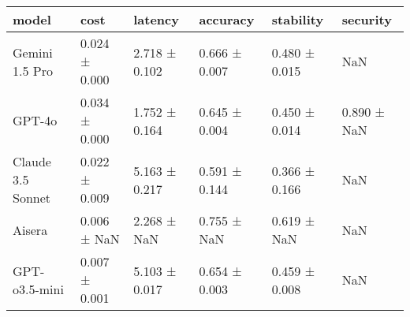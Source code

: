 \begin{tabular}{llllll}
\toprule
model & cost & latency & accuracy & stability & security \\
\midrule
Gemini 1.5 Pro & 0.024 ± 0.000 & 2.718 ± 0.102 & 0.666 ± 0.007 & 0.480 ± 0.015 & NaN \\
GPT-4o & 0.034 ± 0.000 & 1.752 ± 0.164 & 0.645 ± 0.004 & 0.450 ± 0.014 & 0.890 ± NaN \\
Claude 3.5 Sonnet & 0.022 ± 0.009 & 5.163 ± 0.217 & 0.591 ± 0.144 & 0.366 ± 0.166 & NaN \\
Aisera & 0.006 ± NaN & 2.268 ± NaN & 0.755 ± NaN & 0.619 ± NaN & NaN \\
GPT-o3.5-mini & 0.007 ± 0.001 & 5.103 ± 0.017 & 0.654 ± 0.003 & 0.459 ± 0.008 & NaN \\
\bottomrule
\end{tabular}
